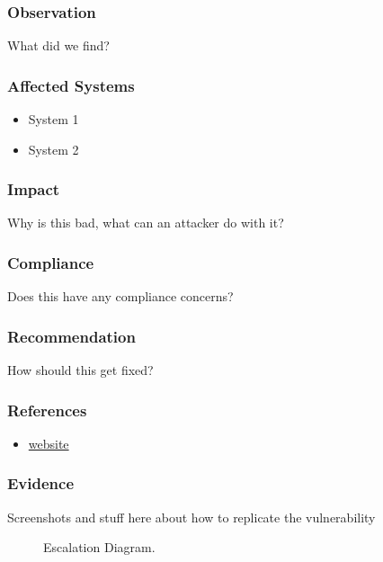 
\subsubsection*{Observation}

What did we find?

\subsubsection*{Affected Systems}

\begin{itemize}
    \item System 1
    \item System 2
\end{itemize}

\subsubsection*{Impact}

Why is this bad, what can an attacker do with it?

\subsubsection*{Compliance}

Does this have any compliance concerns?

\subsubsection*{Recommendation}

How should this get fixed?

\subsubsection*{References}

\begin{itemize}
    \item \href{url}{website}
\end{itemize}

\subsubsection*{Evidence}

Screenshots and stuff here about how to replicate the vulnerability
\begin{figure}[H]
    \centering
    \captionsetup{justification=centering}
    \caption{Escalation Diagram.}
\end{figure}